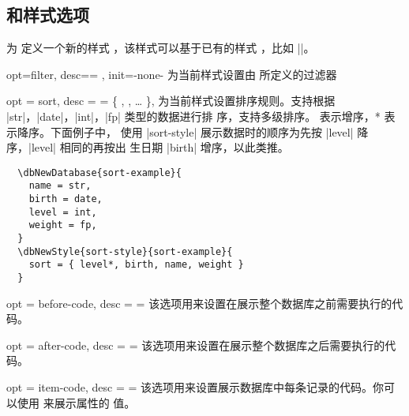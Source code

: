 \documentclass[full]{l3doc}
\begin{document}
\begin{documentation}
\subsection{ 和样式选项}

\begin{function}{\dbNewStyle}
  \begin{syntax}
        
  \end{syntax}

  为  定义一个新的样式 ，该样式可以基于已有的样式
  ，比如 ||。
\end{function}

\bigskip

\begin{option}{opt=filter, desc={= }, init=-none-}
  为当前样式设置由  所定义的过滤器
\end{option}

\begin{option}{
  opt = sort,
  desc = {= \{ , , \ldots{} \}},
}
  为当前样式设置排序规则。支持根据 |str|，|date|，|int|，|fp| 类型的数据进行排
  序，支持多级排序。 表示增序，* 表示降序。下面例子中，
  使用 |sort-style| 展示数据时的顺序为先按 |level| 降序，|level| 相同的再按出
  生日期 |birth| 增序，以此类推。
\end{option}

\begin{verbatim}
  \dbNewDatabase{sort-example}{
    name = str,
    birth = date,
    level = int,
    weight = fp,
  }
  \dbNewStyle{sort-style}{sort-example}{
    sort = { level*, birth, name, weight }
  }
\end{verbatim}

\begin{option}{
  opt = before-code,
  desc = {= }
}
  该选项用来设置在展示整个数据库之前需要执行的代码。
\end{option}

\begin{option}{
  opt = after-code,
  desc = {= }
}
  该选项用来设置在展示整个数据库之后需要执行的代码。
\end{option}

\begin{option}{
  opt = item-code,
  desc = {= }
}
  该选项用来设置展示数据库中每条记录的代码。你可以使用  来展示属性的
  值。
\end{option}


\end{documentation}
\end{document}
